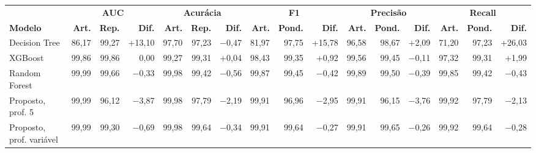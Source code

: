 \begin{tabular}{lrrrrrrrrrrrrrrr}
\hline
\multicolumn{1}{c}{\textbf{}} & \multicolumn{3}{c}{\textbf{AUC}} & \multicolumn{3}{c}{\textbf{Acurácia}} & \multicolumn{3}{c}{\textbf{F1}} & \multicolumn{3}{c}{\textbf{Precisão}} & \multicolumn{3}{c}{\textbf{Recall}} \\
\textbf{Modelo} & \textbf{Art.} & \textbf{Rep.} & \textbf{Dif.} & \textbf{Art.} & \textbf{Rep.} & \textbf{Dif.} & \textbf{Art.} & \textbf{Pond.} & \textbf{Dif.} & \textbf{Art.} & \textbf{Pond.} & \textbf{Dif.} & \textbf{Art.} & \textbf{Pond.} & \textbf{Dif.} \\ \hline
Decision Tree & 86,17 & 99,27 & +13,10 & 97,70 & 97,23 & $-$0,47 & 81,97 & 97,75 & +15,78 & 96,58 & 98,67 & +2,09 & 71,20 & 97,23 & +26,03 \\
XGBoost & 99,86 & 99,86 & 0,00 & 99,27 & 99,31 & +0,04 & 98,43 & 99,35 & +0,92 & 99,56 & 99,45 & $-$0,11 & 97,32 & 99,31 & +1,99 \\
Random Forest & 99,99 & 99,66 & $-$0,33 & 99,98 & 99,42 & $-$0,56 & 99,87 & 99,45 & $-$0,42 & 99,89 & 99,50 & $-$0,39 & 99,85 & 99,42 & $-$0,43 \\
Proposto, prof. 5 & 99,99 & 96,12 & $-$3,87 & 99,98 & 97,79 & $-$2,19 & 99,91 & 96,96 & $-$2,95 & 99,91 & 96,15 & $-$3,76 & 99,92 & 97,79 & $-$2,13 \\
Proposto, prof. variável & 99,99 & 99,30 & $-$0,69 & 99,98 & 99,64 & $-$0,34 & 99,91 & 99,64 & $-$0,27 & 99,91 & 99,65 & $-$0,26 & 99,92 & 99,64 & $-$0,28 \\
\hline
\end{tabular}
